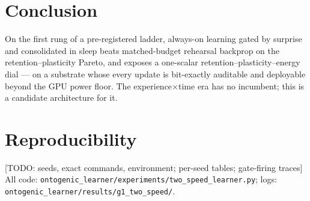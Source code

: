 \documentclass[11pt]{article}
\newcommand{\todo}[1]{\textcolor{red!70!black}{[TODO: #1]}}
\begin{document}
\section{Conclusion}
On the first rung of a pre-registered ladder, always-on learning gated by surprise and
consolidated in sleep beats matched-budget rehearsal backprop on the retention--plasticity
Pareto, and exposes a one-scalar retention--plasticity--energy dial --- on a substrate whose
every update is bit-exactly auditable and deployable beyond the GPU power floor. The
experience$\times$time era has no incumbent; this is a candidate architecture for it.




\appendix
\section{Reproducibility}
\todo{seeds, exact commands, environment; per-seed tables; gate-firing traces}
All code: \texttt{ontogenic\_learner/experiments/two\_speed\_learner.py}; logs:
\texttt{ontogenic\_learner/results/g1\_two\_speed/}.
\end{document}

